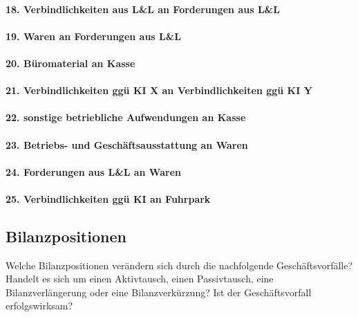 \documentclass[paper=a4, fontsize=11pt]{scrartcl}
\numberwithin{equation}{section}
\numberwithin{figure}{section}
\numberwithin{table}{section}
\begin{document}
\paragraph{18. Verbindlichkeiten aus L&L an Forderungen aus L&L}

\paragraph{19. Waren an Forderungen aus L&L}

\paragraph{20. Büromaterial an Kasse}

\paragraph{21. Verbindlichkeiten ggü KI X an Verbindlichkeiten ggü KI Y}

\paragraph{22. sonstige betriebliche Aufwendungen an Kasse}

\paragraph{23. Betriebs- und Geschäftsausstattung an Waren}

\paragraph{24. Forderungen aus L&L an Waren}

\paragraph{25. Verbindlichkeiten ggü KI an Fuhrpark}

\subsection{Bilanzpositionen}
Welche Bilanzpositionen verändern sich durch die nachfolgende Geschäftsvorfälle? Handelt es sich um einen Aktivtausch, einen Passivtausch, eine Bilanzverlängerung oder eine Bilanzverkürzung? Ist der Geschäftsvorfall erfolgswirksam? \\
\end{document}
